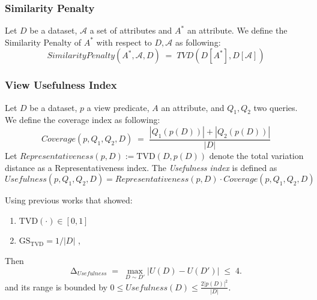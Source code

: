\subsubsection{Similarity Penalty}

\begin{definition}
Let $D$ be a dataset, $\mathcal{A}$ a set of attributes and $A^*$ an attribute.
We define the Similarity Penalty of $A^*$ with respect to $D, \mathcal{A}$ as following:
\begin{equation}
SimilarityPenalty(A^*,\mathcal{A}, D) \;=\; TVD(D[A^*], D[\mathcal{A}])
\end{equation}
\end{definition}

\subsubsection{View Usefulness Index}

\begin{definition}
Let $D$ be a dataset, $p$ a view predicate, $A$ an attribute, and $Q_1,Q_2$ two queries.
We define the coverage index as following:
\begin{equation}
Coverage(p,Q_1, Q_2, D) \;=\; \frac{|Q_1(p(D))| + |Q_2(p(D))|}{|D|}
\end{equation}
Let $Representativeness(p, D) := \mathrm{TVD}(D, p(D))$ denote the total variation distance as a Representativeness index.  
The \emph{Usefulness index} is defined as
\begin{equation}
Usefulness(p,Q_1,Q_2,D) = Representativeness(p,D) \cdot Coverage(p,Q_1,Q_2,D)
\end{equation}
\end{definition}

\begin{proposition}
Using previous works that showed: 
\begin{enumerate}
  \item $\mathrm{TVD}(\cdot) \in [0,1]$
  \item $\mathrm{GS}_{\mathrm{TVD}} = 1/|D|$ ,
\end{enumerate}
Then
\[
\mathrm{\Delta}_{Usefulness} \;=\; \max_{D\sim D'} |U(D) - U(D')| \; \leq \; 4.
\]
and its range is bounded by $0 \le Usefulness(D) \le \frac{2|p(D)|^2}{|D|}$.
\end{proposition}


